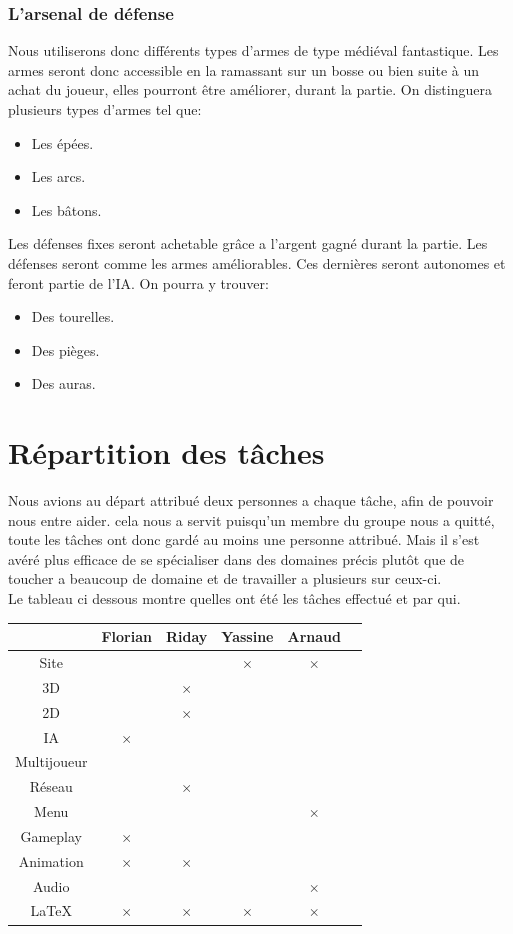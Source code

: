 \documentclass[a4paper, 12pt]{article}
\begin{document}
		\subsubsection{L'arsenal de défense}
		Nous utiliserons donc différents types d’armes de type médiéval fantastique.
Les armes seront donc accessible en la ramassant sur un bosse ou bien  suite à un achat du joueur, elles pourront être améliorer, durant la partie. On distinguera plusieurs types d’armes tel que:
	\begin{itemize}
	\item Les épées.
	\item Les arcs.
	\item Les bâtons.
	\end{itemize}
Les défenses fixes seront achetable grâce a l’argent gagné durant la partie. Les défenses seront comme les armes améliorables. Ces dernières seront autonomes et feront partie de l’IA. On pourra y trouver:
	\begin{itemize}
	\item Des tourelles.
	\item Des pièges.
	\item Des auras.
	\end{itemize}
\newpage
\section{Répartition des tâches}
Nous avions au départ attribué deux personnes a chaque tâche, afin de pouvoir nous entre aider. cela nous a servit puisqu'un membre du groupe nous a quitté, toute les tâches ont donc gardé au moins une personne attribué. Mais il s'est avéré plus efficace de se spécialiser dans des domaines précis plutôt que de toucher a beaucoup de domaine et de travailler a plusieurs sur ceux-ci.\\
Le tableau ci dessous montre quelles ont été les tâches effectué et par qui.
\bigbreak
\bigbreak
	\begin{tabular}{|c||c|c|c|c|c|}
		\hline
		& Florian & Riday & Yassine & Arnaud \\
		\hline
		Site & & & $\times$ & $\times$\\
		\hline
		3D & & $\times$ & &\\
		\hline
		2D & & $\times$ & & \\
		\hline
		IA & $\times$ & & & \\
		\hline
		Multijoueur &  & &  &\\
		\hline
		Réseau & & $\times$ & & \\
		\hline
		Menu & & & & $\times$\\
		\hline
		Gameplay & $\times$ & & &\\
		\hline
		Animation & $\times$ & $\times$ & & \\		
		\hline
		Audio & & & & $\times$\\
		\hline
		\LaTeX & $\times$ & $\times$ & $\times$ & $\times$\\
		\hline
	\end{tabular}
	\newpage
\newpage
\end{document}
